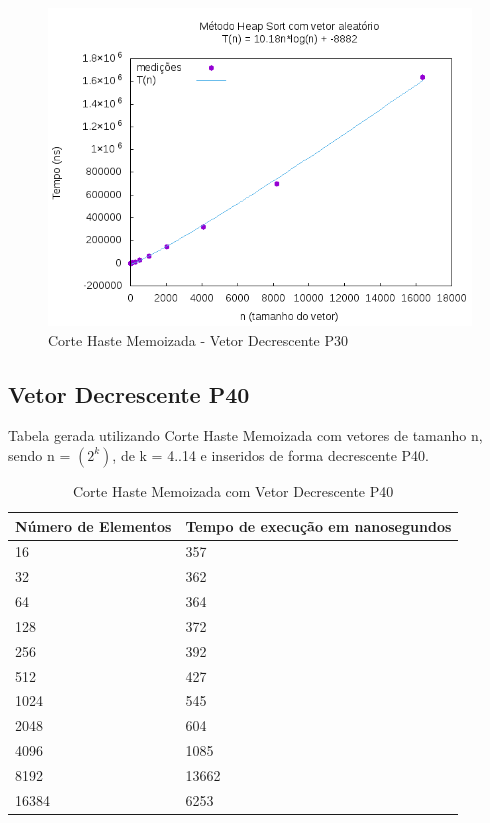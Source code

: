 \documentclass[12pt,a4paper,twoside]{report}
\begin{document}
\begin{figure}[H]
    \centering
    \includegraphics[width=0.7\linewidth]{graficos/HeapSort/vIntAleatorio/vIntAleatorio.png}
  \caption{Corte Haste Memoizada - Vetor Decrescente P30}
\end{figure}




\subsection{Vetor Decrescente P40}
Tabela gerada utilizando Corte Haste Memoizada com vetores de tamanho n, sendo n = $(2^k)$, de k = 4..14 e inseridos de forma decrescente P40.
\begin{table}[H]
\centering
\caption{Corte Haste Memoizada com Vetor Decrescente P40}
\label{my-label}
\begin{tabular}{|l|l|}
\hline
\multicolumn{1}{|c|}{\textbf{Número de Elementos}} & \multicolumn{1}{c|}{\textbf{Tempo de execução em nanosegundos}} \\ \hline
16 & 357 \\ \hline
32 & 362 \\ \hline
64 & 364 \\ \hline
128 & 372 \\ \hline
256 & 392 \\ \hline
512 & 427 \\ \hline
1024 & 545 \\ \hline
2048 & 604 \\ \hline
4096 & 1085 \\ \hline
8192 & 13662 \\ \hline
16384 & 6253 \\ \hline
\end{tabular}
\end{table}
\end{document}
